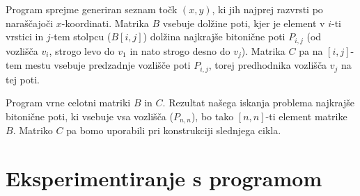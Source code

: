 \documentclass[12pt,a4paper]{amsart}
\theoremstyle{definition}
\theoremstyle{plain}
\begin{document}
\noindent
Program sprejme generiran seznam točk $(x,y)$, ki jih najprej razvrsti po naraščajoči $x$-koordinati. 
Matrika $B$ vsebuje dolžine poti, kjer je element v $i$-ti vrstici in $j$-tem stolpcu ($B[i,j]$) dolžina
najkrajše bitonične poti $P_{i,j}$ (od vozlišča $v_i$, strogo levo do $v_1$ in nato strogo desno do $v_j$).
Matrika $C$ pa na $[i,j]$-tem mestu vsebuje predzadnje vozlišče poti $P_{i,j}$, torej predhodnika vozlišča
$v_j$ na tej poti.
\newline

\noindent
Program vrne celotni matriki $B$ in $C$. Rezultat našega iskanja problema najkrajše bitonične poti, ki 
vsebuje vsa vozlišča ($P_{n,n}$), bo tako $[n,n]$-ti element matrike $B$. Matriko $C$ pa bomo uporabili pri
konstrukciji slednjega cikla.
\newline

\section{Eksperimentiranje s programom}
\end{document}
